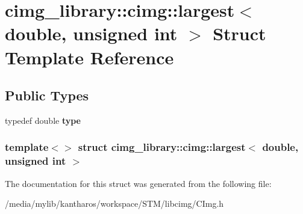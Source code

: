 \hypertarget{structcimg__library_1_1cimg_1_1largest_3_01double_00_01unsigned_01int_01_4}{
\section{cimg\_\-library::cimg::largest$<$ double, unsigned int $>$ Struct Template Reference}
\label{structcimg__library_1_1cimg_1_1largest_3_01double_00_01unsigned_01int_01_4}
}
\subsection*{Public Types}
\begin{DoxyCompactItemize}
\item 
\hypertarget{structcimg__library_1_1cimg_1_1largest_3_01double_00_01unsigned_01int_01_4_a5eb31b716221477896cc0baa5843c958}{
typedef double {\bfseries type}}
\label{structcimg__library_1_1cimg_1_1largest_3_01double_00_01unsigned_01int_01_4_a5eb31b716221477896cc0baa5843c958}

\end{DoxyCompactItemize}
\subsubsection*{template$<$$>$ struct cimg\_\-library::cimg::largest$<$ double, unsigned int $>$}



The documentation for this struct was generated from the following file:\begin{DoxyCompactItemize}
\item 
/media/mylib/kantharos/workspace/STM/libcimg/CImg.h\end{DoxyCompactItemize}
